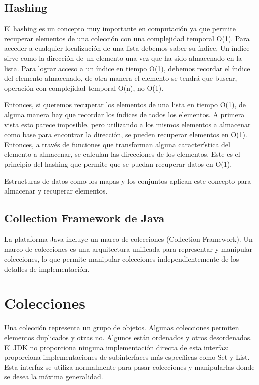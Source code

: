 \documentclass[11pt]{article}
\begin{document}
\subsection{Hashing}
\par
El hashing es un concepto muy importante en computación ya que 
permite recuperar elementos de una colección con una complejidad 
temporal O(1).  Para acceder a cualquier localización de una lista 
debemos saber su índice. Un índice sirve como la dirección de un 
elemento una vez que ha sido almacenado en la lista. Para lograr 
acceso a un índice en tiempo O(1), debemos recordar el índice del 
elemento almacenado, de otra manera el elemento se tendrá que buscar, 
operación con complejidad temporal O(n), no O(1). 

\par
Entonces, si queremos recuperar los elementos de una lista en tiempo 
O(1), de alguna manera hay que recordar los índices de todos los 
elementos. A primera vista esto parece imposible, pero utilizando a 
los mismos elementos a almacenar como base para encontrar la 
dirección, se pueden recuperar elementos en O(1). Entonces, a través 
de funciones que transforman alguna característica del elemento a 
almacenar, se calculan las direcciones de los elementos. Este es el 
principio del hashing que permite que se puedan recuperar datos en 
O(1). 
\par
Estructuras de datos como los mapas y los conjuntos aplican este 
concepto para almacenar y recuperar elementos. 

\subsection{Collection Framework de Java}
\par
La plataforma Java incluye un marco de colecciones (Collection 
Framework). Un marco de colecciones es una arquitectura unificada 
para representar y manipular colecciones, lo que permite manipular 
colecciones independientemente de los detalles de implementación. 

\section{Colecciones}
\par
Una colección representa un grupo de objetos. Algunas colecciones 
permiten elementos duplicados y otras no. Algunos están ordenados y 
otros desordenados. El JDK no proporciona ninguna implementación 
directa de esta interfaz: proporciona implementaciones de 
subinterfaces más específicas como Set y List. Esta interfaz se 
utiliza normalmente para pasar colecciones y manipularlas donde se 
desea la máxima generalidad.
\end{document}

